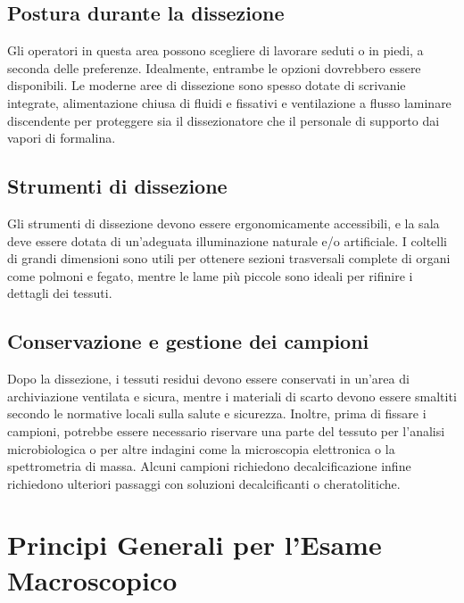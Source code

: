 \subsection{Postura durante la dissezione}
Gli operatori in questa area possono scegliere di lavorare seduti o in piedi, a seconda delle preferenze. Idealmente, entrambe le opzioni dovrebbero essere disponibili. Le moderne aree di dissezione sono spesso dotate di scrivanie integrate, alimentazione chiusa di fluidi e fissativi e ventilazione a flusso laminare discendente per proteggere sia il dissezionatore che il personale di supporto dai vapori di formalina.

\subsection{Strumenti di dissezione}
Gli strumenti di dissezione devono essere ergonomicamente accessibili, e la sala deve essere dotata di un'adeguata illuminazione naturale e/o artificiale. I coltelli di grandi dimensioni sono utili per ottenere sezioni trasversali complete di organi come polmoni e fegato, mentre le lame più piccole sono ideali per rifinire i dettagli dei tessuti.

\subsection{Conservazione e gestione dei campioni}
Dopo la dissezione, i tessuti residui devono essere conservati in un'area di archiviazione ventilata e sicura, mentre i materiali di scarto devono essere smaltiti secondo le normative locali sulla salute e sicurezza. Inoltre, prima di fissare i campioni, potrebbe essere necessario riservare una parte del tessuto per l'analisi microbiologica o per altre indagini come la microscopia elettronica o la spettrometria di massa. Alcuni campioni richiedono decalcificazione infine richiedono ulteriori passaggi con soluzioni decalcificanti o cheratolitiche.

\section{Principi Generali per l'Esame Macroscopico}

